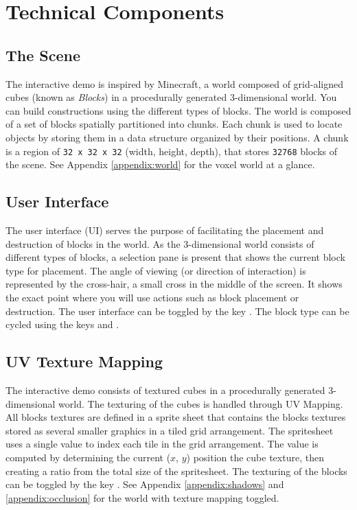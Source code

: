 \documentclass{book}
\begin{document}
\chapter{Technical Components}
\section{The Scene}
The interactive demo is inspired by Minecraft, a world composed of grid-aligned cubes (known as \textit{Blocks}) in a procedurally generated 3-dimensional world.  You can build constructions using the different types of blocks.  The world is composed of a set of blocks spatially partitioned into chunks.  Each chunk is used to locate objects by storing them in a data structure organized by their positions.   A chunk is a region of \texttt{32 x 32 x 32} (width, height, depth), that stores \texttt{32768} blocks of the scene.
\vskip 2.5mm\noindent
See Appendix \ref{appendix:world} for the voxel world at a glance.
  
\section{User Interface}
The user interface (UI) serves the purpose of facilitating the placement and destruction of blocks in the world.  As the 3-dimensional world consists of different types of blocks, a selection pane is present that shows the current block type for placement.  The angle of viewing (or direction of interaction) is represented by the cross-hair, a small cross in the middle of the screen.  It shows the exact point where you will use actions such as block placement or destruction.
\vskip 2.5mm\noindent
The user interface can be toggled by the key .  The block type can be cycled using the keys  and .

\section{UV Texture Mapping}
The interactive demo consists of textured cubes in a procedurally generated 3-dimensional world.  The texturing of the cubes is handled through UV Mapping.  All blocks textures are defined in a sprite sheet that contains the blocks textures stored as several smaller graphics in a tiled grid arrangement.  The spritesheet uses a single value to index each tile in the grid arrangement.  The value is computed by determining the current ($x$, $y$) position the cube texture, then creating a ratio from the total size of the spritesheet.
\vskip 2.5mm\noindent
The texturing of the blocks can be toggled by the key .  See Appendix \ref{appendix:shadows} and \ref{appendix:occlusion} for the world with texture mapping toggled.
\end{document}
